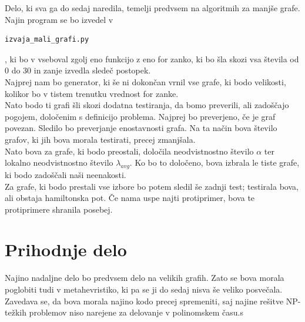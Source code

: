 \documentclass[12pt,a4paper]{amsart}
\begin{document}
Delo, ki sva ga do sedaj naredila, temelji predvsem na algoritmih za manjše grafe. Najin program se bo izvedel v \begin{verbatim}
izvaja_mali_grafi.py
\end{verbatim}, ki bo v vseboval zgolj eno funkcijo z eno for zanko, ki bo šla skozi vsa števila od 0 do 30 in zanje izvedla sledeč postopek.\\
Najprej nam bo generator, ki še ni dokončan vrnil vse grafe, ki bodo velikosti, kolikor bo v tistem trenutku vrednost for zanke.\\
 Nato bodo ti grafi šli skozi dodatna testiranja, da bomo preverili, ali zadoščajo pogojem, določenim s definicijo problema. Najprej bo preverjeno, če je graf povezan. Sledilo bo preverjanje enostavnosti grafa. Na ta način bova število grafov, ki jih bova morala testirati, precej zmanjšala. \\
 Nato bova za grafe, ki bodo preostali, določila neodvistnostno število $\alpha$ ter lokalno neodvistnostno število $\lambda_{avg}$. Ko bo to določeno, bova izbrala le tiste grafe, ki bodo zadoščali naši neenakosti. \\
 Za grafe, ki bodo prestali vse izbore bo potem sledil še zadnji test; testirala bova, ali obstaja hamiltonska pot. Če nama uspe najti protiprimer, bova te protiprimere shranila posebej.
\section{Prihodnje delo}
Najino nadaljne delo bo predvsem delo na velikih grafih. Zato se bova morala poglobiti tudi v metahevristiko, ki pa se ji do sedaj nisva še veliko posvečala. Zavedava se, da bova morala najino kodo precej spremeniti, saj najine rešitve NP-težkih problemov niso narejene za delovanje v polinomskem času.s
\end{document}
